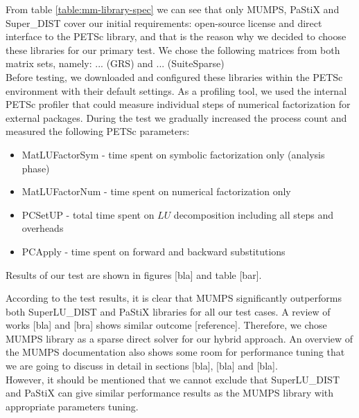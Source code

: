 From table \ref{table:mm-library-spec} we can see that only MUMPS, PaStiX and Super\_DIST cover our initial requirements: open-source license and direct interface to the PETSc library, and that is the reason why we decided to choose these libraries for our primary test. We chose the following matrices from both matrix sets, namely: ... (GRS) and ... (SuiteSparse)\\


Before testing, we downloaded and configured these libraries within the PETSc environment with their default settings. As a profiling tool, we used the internal PETSc profiler that could measure individual steps of numerical factorization for external packages. During the test we gradually increased the process count and measured the following PETSc parameters: 

\begin{itemize}

	\item MatLUFactorSym - time spent on symbolic factorization only (analysis phase)
	
	\item MatLUFactorNum - time spent on numerical factorization only
	
	\item PCSetUP - total time spent on $LU$ decomposition including all steps and overheads 
	
	\item PCApply - time spent on forward and backward substitutions
\end{itemize}

Results of our test are shown in figures [bla] and table [bar]. 


According to the test results, it is clear that MUMPS significantly outperforms both SuperLU\_DIST and  PaStiX libraries for all our test cases. A review of works [bla] and [bra] shows similar outcome [reference]. Therefore, we chose MUMPS library as a sparse direct solver for our hybrid approach. An overview of the MUMPS documentation also shows some room for performance tuning that we are going to discuss in detail in sections [bla], [bla] and  [bla].\\


However, it should be mentioned that we cannot exclude that SuperLU\_DIST  and PaStiX can give similar performance results as the MUMPS library with appropriate parameters tuning.\\